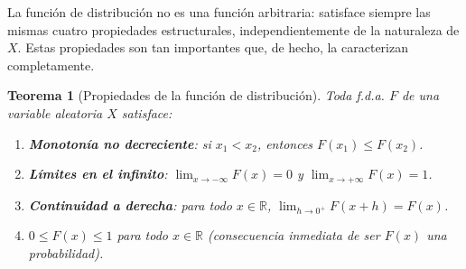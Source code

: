 \documentclass[11pt,a4paper]{article}
\theoremstyle{plain}
\newtheorem{teorema}{Teorema}[section]
\theoremstyle{definition}
\theoremstyle{remark}
\begin{document}
La función de distribución no es una función arbitraria: satisface siempre las mismas cuatro propiedades estructurales, independientemente de la naturaleza de $X$. Estas propiedades son tan importantes que, de hecho, la caracterizan completamente.

\begin{teorema}[Propiedades de la función de distribución]\label{thm:propF}
Toda f.d.a. $F$ de una variable aleatoria $X$ satisface:
\begin{enumerate}[label=(\arabic*)]
\item \textbf{Monotonía no decreciente}: si $x_1<x_2$, entonces $F(x_1)\le F(x_2)$.
\item \textbf{Límites en el infinito}: $\displaystyle\lim_{x\to-\infty}F(x)=0$ y $\displaystyle\lim_{x\to+\infty}F(x)=1$.
\item \textbf{Continuidad a derecha}: para todo $x\in\mathbb{R}$, $\displaystyle\lim_{h\to 0^+}F(x+h)=F(x)$.
\item $0\le F(x)\le 1$ para todo $x\in\mathbb{R}$ (consecuencia inmediata de ser $F(x)$ una probabilidad).
\end{enumerate}
\end{teorema}
\end{document}
